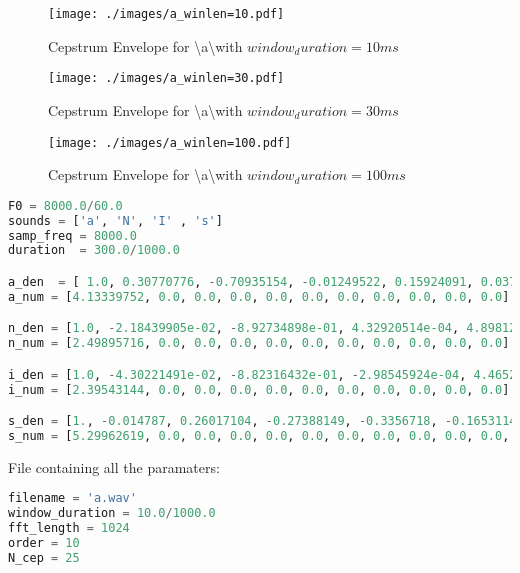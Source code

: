 \documentclass[a4paper]{article}
\begin{document}
\begin{figure}[h!]
    \texttt{[image: ./images/a\_winlen=10.pdf]}
    \caption{Cepstrum Envelope for \textbackslash a\textbackslash with $window_duration=10 ms$}
    \label{fig:1}
\end{figure}

\begin{figure}[h!]
    \texttt{[image: ./images/a\_winlen=30.pdf]}
    \caption{Cepstrum Envelope for \textbackslash a\textbackslash with $window_duration=30 ms$}
    \label{fig:1}
\end{figure}

\begin{figure}[h!]
    \texttt{[image: ./images/a\_winlen=100.pdf]}
    \caption{Cepstrum Envelope for \textbackslash a\textbackslash with $window_duration=100 ms$}
    \label{fig:1}
\end{figure}

\begin{lstlisting}[language=Python, caption=params.py]
F0 = 8000.0/60.0
sounds = ['a', 'N', 'I' , 's'] 
samp_freq = 8000.0
duration  = 300.0/1000.0

a_den  = [ 1.0, 0.30770776, -0.70935154, -0.01249522, 0.15924091, 0.03700667, 0.15999816, -0.03421146, -0.09653191, -0.25471351, -0.03752092]
a_num = [4.13339752, 0.0, 0.0, 0.0, 0.0, 0.0, 0.0, 0.0, 0.0, 0.0, 0.0]

n_den = [1.0, -2.18439905e-02, -8.92734898e-01, 4.32920514e-04, 4.89812545e-04, 4.89186592e-04, 4.88165983e-04, 4.86755417e-04, 4.86350841e-04, 2.22938139e-02, 6.37348443e-02]
n_num = [2.49895716, 0.0, 0.0, 0.0, 0.0, 0.0, 0.0, 0.0, 0.0, 0.0, 0.0]

i_den = [1.0, -4.30221491e-02, -8.82316432e-01, -2.98545924e-04, 4.46520736e-04, 4.46443384e-04, 4.45346265e-04, 4.44658817e-04, 1.39040245e-03, 9.07980247e-02, -1.67148707e-02]
i_num = [2.39543144, 0.0, 0.0, 0.0, 0.0, 0.0, 0.0, 0.0, 0.0, 0.0, 0.0]

s_den = [1., -0.014787, 0.26017104, -0.27388149, -0.3356718, -0.16531149, -0.04300548, 0.17950459, -0.03551942, -0.08449707, -0.05001272, -0.08581098, 0.0386388, -0.10588742, 0.01688407, -0.04029857, -0.00275163, -0.05118139, -0.13576579, -0.03593119, -0.0137991]
s_num = [5.29962619, 0.0, 0.0, 0.0, 0.0, 0.0, 0.0, 0.0, 0.0, 0.0, 0.0, 0.0, 0.0, 0.0, 0.0, 0.0, 0.0, 0.0, 0.0, 0.0, 0.0]
\end{lstlisting}


File containing all the paramaters:
\begin{lstlisting}[language=Python, caption=params.py]
filename = 'a.wav'
window_duration = 10.0/1000.0
fft_length = 1024
order = 10
N_cep = 25
\end{lstlisting}
\end{document}
